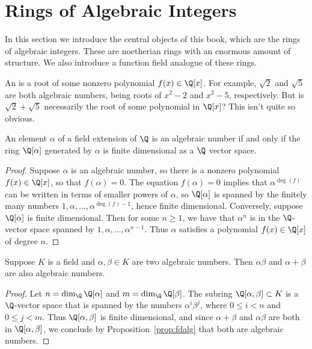 \section{Rings of Algebraic Integers}

In this section we introduce the central objects of this book, which
are the rings of algebraic integers.  These are noetherian rings with
an enormous amount of structure.  We also introduce a function field
analogue of these rings.


An  is a root of some nonzero polynomial $f(x) \in \Q[x]$.
For example, $\sqrt{2}$ and $\sqrt{5}$ are both algebraic numbers, being
roots of $x^2-2$ and $x^2-5$, respectively.
But is $\sqrt{2} + \sqrt{5}$ necessarily the root of some polynomial in $\Q[x]$?
This isn't quite so obvious.

\begin{proposition}\label{prop:fdalg}
	An element $\alpha$ of a field extension of $\Q$ is an
	algebraic number if and only if the ring $\Q[\alpha]$
	generated by $\alpha$ is finite dimensional as a $\Q$ vector
	space.
\end{proposition}
\begin{proof}
	Suppose $\alpha$ is an algebraic number, so there is a nonzero
	polynomial $f(x)\in\Q[x]$, so that $f(\alpha)=0$. The equation
	$f(\alpha)=0$ implies that $\alpha^{\deg(f)}$ can be written in
	terms of smaller powers of $\alpha$, so $\Q[\alpha]$ is spanned
	by the finitely many numbers $1,\alpha,\ldots,\alpha^{\deg(f)-1}$,
	hence finite dimensional. Conversely, suppose $\Q[\alpha]$ is finite
	dimensional.  Then for some $n\geq 1$, we have that $\alpha^n$ is in
	the $\Q$-vector space spanned by $1,\alpha,\ldots, \alpha^{n-1}$.
	Thus $\alpha$ satisfies a polynomial $f(x) \in \Q[x]$ of degree $n$.
\end{proof}

\begin{proposition}\label{prop:algnumfield}
	Suppose $K$ is a field and $\alpha, \beta\in K$ are two
	algebraic numbers. Then $\alpha\beta$ and $\alpha+\beta$
	are also algebraic numbers.
\end{proposition}
\begin{proof}
	Let $n = \dim_\Q \Q[\alpha]$ and $m = \dim_\Q \Q[\beta]$.
	The subring $\Q[\alpha,\beta]\subset K$ is a
	$\Q$-vector space that is spanned by the numbers $\alpha^i\beta^j$,
	where $0\leq i<n$ and $0\leq j<m$. Thus
	$\Q[\alpha,\beta]$ is finite dimensional, and since $\alpha+\beta$
	and $\alpha\beta$ are both in $\Q[\alpha,\beta]$, we conclude by Proposition~\ref{prop:fdalg} that both are algebraic numbers.
\end{proof}

